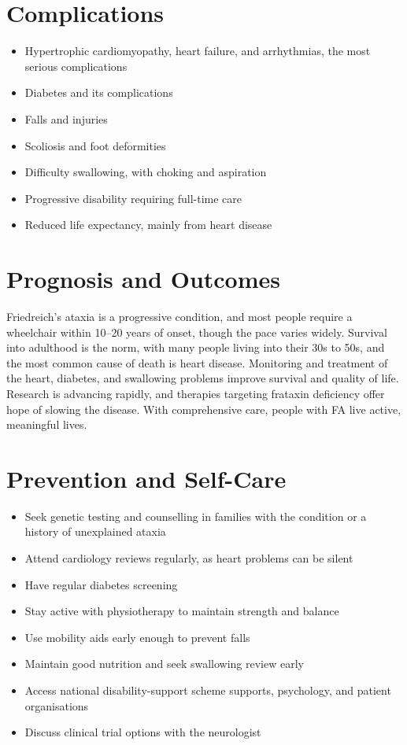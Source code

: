 \section*{Complications}
\begin{itemize}
    \item Hypertrophic cardiomyopathy, heart failure, and arrhythmias, the most serious complications
    \item Diabetes and its complications
    \item Falls and injuries
    \item Scoliosis and foot deformities
    \item Difficulty swallowing, with choking and aspiration
    \item Progressive disability requiring full-time care
    \item Reduced life expectancy, mainly from heart disease
\end{itemize}

\section*{Prognosis and Outcomes}
Friedreich's ataxia is a progressive condition, and most people require a wheelchair within 10--20 years of onset, though the pace varies widely. Survival into adulthood is the norm, with many people living into their 30s to 50s, and the most common cause of death is heart disease. Monitoring and treatment of the heart, diabetes, and swallowing problems improve survival and quality of life. Research is advancing rapidly, and therapies targeting frataxin deficiency offer hope of slowing the disease. With comprehensive care, people with FA live active, meaningful lives.

\section*{Prevention and Self-Care}
\begin{itemize}
    \item Seek genetic testing and counselling in families with the condition or a history of unexplained ataxia
    \item Attend cardiology reviews regularly, as heart problems can be silent
    \item Have regular diabetes screening
    \item Stay active with physiotherapy to maintain strength and balance
    \item Use mobility aids early enough to prevent falls
    \item Maintain good nutrition and seek swallowing review early
    \item Access national disability-support scheme supports, psychology, and patient organisations
    \item Discuss clinical trial options with the neurologist
\end{itemize}

